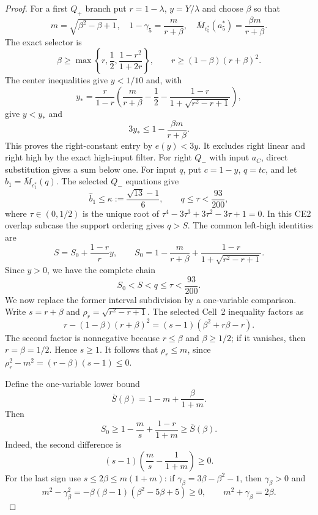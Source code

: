 \begin{proof}
For a first $Q_+$ branch put $r=1-\lambda$,
$y=Y/\lambda$ and choose $\beta$ so that
\[
 m=\sqrt{\beta^2-\beta+1},\quad
 1-\gamma_5=\frac m{r+\beta},\quad
 \overline M_{c_5^\ast}(a_5^\ast)=\frac{\beta m}{r+\beta}.
\]
The exact selector is
\begin{equation}
 \beta\ge\max\left\{r,\frac12,\frac{1-r^2}{1+2r}\right\},\qquad
 r\ge(1-\beta)(r+\beta)^2.
 \label{eq:407-high-domain}
\end{equation}
The center inequalities give $y<1/10$ and, with
\[
 y_*=\frac r{1-r}
 \left(\frac m{r+\beta}-\frac12-\frac{1-r}{1+\sqrt{r^2-r+1}}\right),
\]
give $y<y_*$ and
\[
 3y_*\le1-\frac{\beta m}{r+\beta}.
\]
This proves the right-constant entry by $e(y)<3y$.  It excludes right linear and
right high by the exact high-input filter.  For right $Q_-$ with input
$a_C$, direct substitution gives a sum below one.  For input $q$, put
$c=1-y$, $q=tc$, and let $\widehat b_1=\overline M_{c_1^\ast}(q)$.  The selected $Q_-$ equations
give
\[
 \widehat b_1\le\kappa:=\frac{\sqrt{13}-1}{6},\qquad
 q\le\tau<\frac{93}{200},
\]
where $\tau\in(0,1/2)$ is the unique root of
$\tau^4-3\tau^3+3\tau^2-3\tau+1=0$.  In this CE2 overlap subcase the
support ordering gives $q>S$.  The common left-high identities are
\[
 S=S_0+\frac{1-r}{r}y,\qquad
 S_0=1-\frac{m}{r+\beta}+\frac{1-r}{1+\sqrt{r^2-r+1}}.
\]
Since $y>0$, we have the complete chain
\[
 S_0<S<q\le\tau<\frac{93}{200}.
\]
We now replace the former interval subdivision by a one-variable comparison.
Write $s=r+\beta$ and $\rho_r=\sqrt{r^2-r+1}$.  The selected Cell~2
inequality factors as
\[
 r-(1-\beta)(r+\beta)^2
 =(s-1)(\beta^2+r\beta-r).
\]
The second factor is nonnegative because $r\le\beta$ and $\beta\ge1/2$;
if it vanishes, then $r=\beta=1/2$.  Hence $s\ge1$.  It follows that
$\rho_r\le m$, since
$\rho_r^2-m^2=(r-\beta)(s-1)\le0$.

Define the one-variable lower bound
\[
 \overline S(\beta)=1-m+\frac{\beta}{1+m}.
\]
Then
\[
 S_0\ge1-\frac m s+\frac{1-r}{1+m}\ge\overline S(\beta).
\]
Indeed, the second difference is
\[
 (s-1)\left(\frac m s-\frac1{1+m}\right)\ge0.
\]
For the last sign use $s\le2\beta\le m(1+m)$: if
$\gamma_\beta=3\beta-\beta^2-1$, then $\gamma_\beta>0$ and
\[
 m^2-\gamma_\beta^2=-\beta(\beta-1)(\beta^2-5\beta+5)\ge0,
 \qquad m^2+\gamma_\beta=2\beta.
\]


\end{proof}

